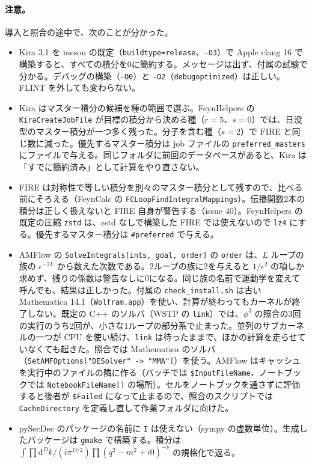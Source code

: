 \documentclass[a4paper,10pt]{ltjsarticle}
\begin{document}
\paragraph{注意。}導入と照合の途中で、次のことが分かった。
\begin{itemize}
\item Kira 3.1 を meson の既定（\texttt{buildtype=release}、\texttt{-O3}）で Apple clang 16 で構築すると、すべての積分を0に簡約する。メッセージは出ず、付属の試験で分かる。デバッグの構築（\texttt{-O0}）と \texttt{-O2}（\texttt{debugoptimized}）は正しい。FLINT を外しても変わらない。
\item Kira はマスター積分の候補を種の範囲で選ぶ。FeynHelpers の \texttt{KiraCreateJobFile} が目標の積分から決める種（$r=5$、$s=0$）では、日没型のマスター積分が一つ多く残った。分子を含む種（$s=2$）で FIRE と同じ数に減った。優先するマスター積分は job ファイルの \texttt{preferred\_masters} にファイルで与える。同じフォルダに前回のデータベースがあると、Kira は「すでに簡約済み」として計算をやり直さない。
\item FIRE は対称性で等しい積分を別々のマスター積分として残すので、比べる前にそろえる（FeynCalc の \texttt{FCLoopFindIntegralMappings}）。伝播関数2本の積分は正しく扱えないと FIRE 自身が警告する（issue 40）。FeynHelpers の既定の圧縮 \texttt{zstd} は、zstd なしで構築した FIRE では使えないので \texttt{lz4} にする。優先するマスター積分は \texttt{\#preferred} で与える。
\item AMFlow の \texttt{SolveIntegrals[ints, goal, order]} の \texttt{order} は、$L$ ループの族の $\epsilon^{-2L}$ から数えた次数である。2ループの族に2を与えると $1/\epsilon^2$ の項しか求めず、残りの係数は警告なしに0になる。同じ族の名前で運動学を変えて呼んでも、結果は正しかった。付属の \texttt{check\_install.sh} は古い Mathematica 14.1（\texttt{Wolfram.app}）を使い、計算が終わってもカーネルが終了しない。既定の C++ のソルバ（WSTP の \texttt{link}）では、$\phi^3$ の照合の3回の実行のうち2回が、小さな1ループの部分系で止まった。並列のサブカーネルの一つが CPU を使い続け、\texttt{link} は待ったままで、ほかの計算を走らせていなくても起きた。照合では Mathematica のソルバ（\texttt{SetAMFOptions["DESolver" -> "MMA"]}）を使う。AMFlow はキャッシュを実行中のファイルの隣に作る（バッチでは \texttt{\$InputFileName}、ノートブックでは \texttt{NotebookFileName[]} の場所）。セルをノートブックを通さずに評価すると後者が \texttt{\$Failed} になって止まるので、照合のスクリプトでは \texttt{CacheDirectory} を定義し直して作業フォルダに向けた。
\item pySecDec のパッケージの名前に \texttt{I} は使えない（sympy の虚数単位）。生成したパッケージは \texttt{gmake} で構築する。積分は $\int\prod\mathrm{d}^Dk/(i\pi^{D/2})\prod(q^2-m^2+i0)^{-\nu}$ の規格化で返る。

\end{itemize}
\end{document}
